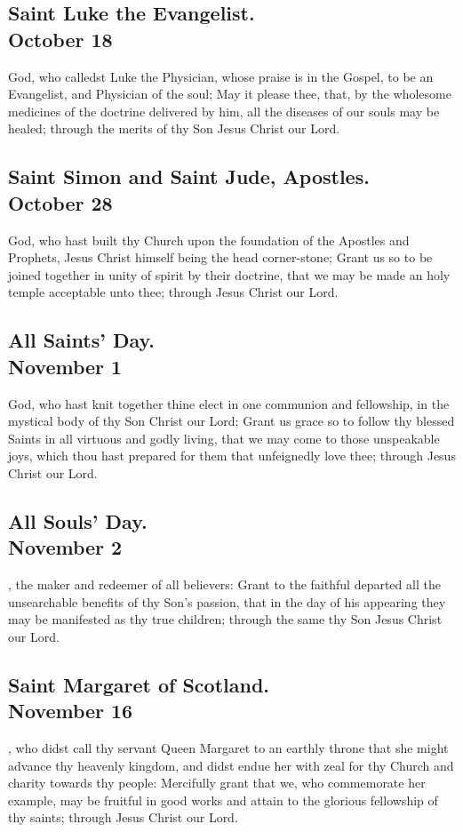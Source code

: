 \subsection{Saint Luke the Evangelist.\\
October 18}
 God, who calledst Luke the Physician, whose praise is in the Gospel, to be an Evangelist, and Physician of the soul; May it please thee, that, by the wholesome medicines of the doctrine delivered by him, all the diseases of our souls may be healed; through the merits of thy Son Jesus Christ our Lord.

\subsection{Saint Simon and Saint Jude, Apostles.\\
October 28}
 God, who hast built thy Church upon the foundation of the Apostles and Prophets, Jesus Christ himself being the head corner-stone; Grant us so to be joined together in unity of spirit by their doctrine, that we may be made an holy temple acceptable unto thee; through Jesus Christ our Lord.

\subsection{All Saints' Day.\\
November 1}
 God, who hast knit together thine elect in one communion and fellowship, in the mystical body of thy Son Christ our Lord; Grant us grace so to follow thy blessed Saints in all virtuous and godly living, that we may come to those unspeakable joys, which thou hast prepared for them that unfeignedly love thee; through Jesus Christ our Lord.

\subsection{All Souls' Day.\\
November 2}
, the maker and redeemer of all believers: Grant to the faithful departed all the unsearchable benefits of thy Son's passion, that in the day of his appearing they may be manifested as thy true children; through the same thy Son Jesus Christ our Lord.

\subsection{Saint Margaret of Scotland.\\
November 16}
, who didst call thy servant Queen Margaret to an earthly throne that she might advance thy heavenly kingdom, and didst endue her with zeal for thy Church and charity towards thy people: Mercifully grant that we, who commemorate her example, may be fruitful in good works and attain to the glorious fellowship of thy saints; through Jesus Christ our Lord.

